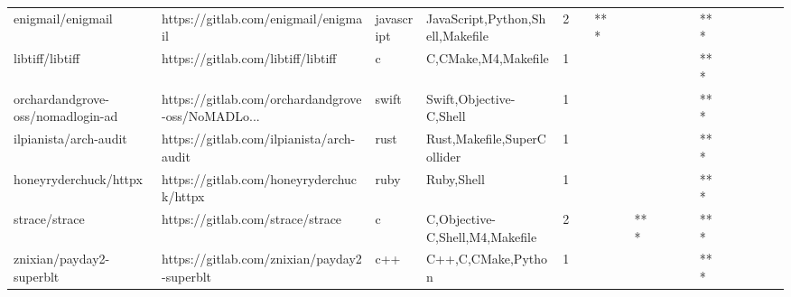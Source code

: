 \begin{tabular}{llllrlllllllllllll}
enigmail/enigmail                                  &               https://gitlab.com/enigmail/enigmail &        javascript &                   JavaScript,Python,Shell,Makefile &       2 &         &    *** &           &                &                 &        &           &       *** &          &          &       &              &          \\
libtiff/libtiff                                    &                 https://gitlab.com/libtiff/libtiff &                 c &                                C,CMake,M4,Makefile &       1 &         &        &           &                &                 &        &           &       *** &          &          &       &              &          \\
orchardandgrove-oss/nomadlogin-ad                  &  https://gitlab.com/orchardandgrove-oss/NoMADLo... &             swift &                            Swift,Objective-C,Shell &       1 &         &        &           &                &                 &        &           &       *** &          &          &       &              &          \\
ilpianista/arch-audit                              &           https://gitlab.com/ilpianista/arch-audit &              rust &                        Rust,Makefile,SuperCollider &       1 &         &        &           &                &                 &        &           &       *** &          &          &       &              &          \\
honeyryderchuck/httpx                              &           https://gitlab.com/honeyryderchuck/httpx &              ruby &                                         Ruby,Shell &       1 &         &        &           &                &                 &        &           &       *** &          &          &       &              &          \\
strace/strace                                      &                   https://gitlab.com/strace/strace &                 c &                    C,Objective-C,Shell,M4,Makefile &       2 &         &        &           &            *** &                 &        &           &       *** &          &          &       &              &          \\
znixian/payday2-superblt                           &        https://gitlab.com/znixian/payday2-superblt &               c++ &                                 C++,C,CMake,Python &       1 &         &        &           &                &                 &        &           &       *** &          &          &       &              &          \\

\end{tabular}
